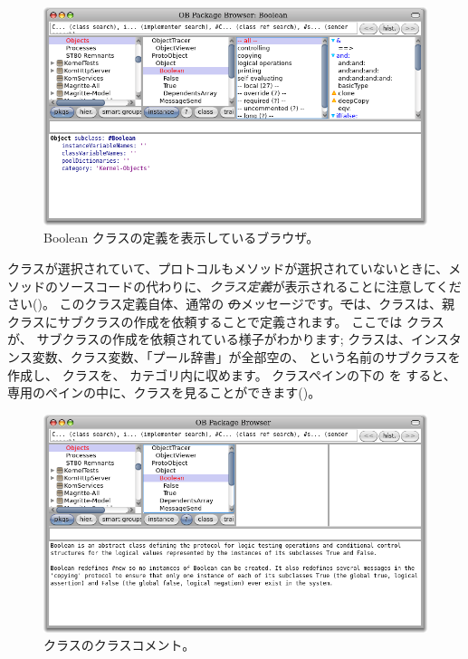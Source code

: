 \documentclass[a4paper,10pt,twoside]{book}
\begin{document}

\begin{figure}[hbt]
\centerline {\includegraphics[width=\textwidth]{Kernel-objects-boolean}}
\caption{Boolean クラスの定義を表示しているブラウザ。
}
\end{figure}

 クラスが選択されていて、プロトコルもメソッドが選択されていないときに、メソッドのソースコードの代わりに、\emph{クラス定義}が表示されることに注意してください()。
このクラス定義自体、通常の \st のメッセージです。\st では、クラスは、親クラスにサブクラスの作成を依頼することで定義されます。
ここでは  クラスが、 サブクラスの作成を依頼されている様子がわかります;  クラスは、インスタンス変数、クラス変数、「プール辞書」が全部空の、 という名前のサブクラスを作成し、 クラスを、 カテゴリ内に収めます。
クラスペインの下の  を \click すると、専用のペインの中に、クラスを見ることができます()。

\begin{figure}[hbt]
\centerline {\includegraphics[width=\textwidth]{classComment}}
\caption{ クラスのクラスコメント。
}
\end{figure}
\end{document}
